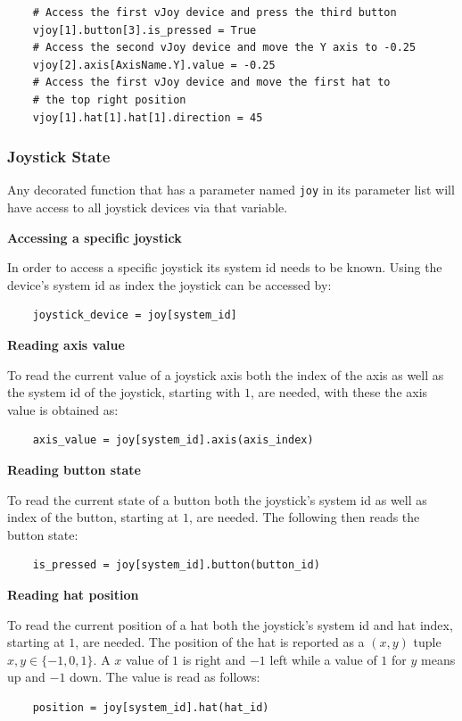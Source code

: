 \documentclass[a4, 10pt]{article}
\begin{document}
\begin{verbatim}
    # Access the first vJoy device and press the third button
    vjoy[1].button[3].is_pressed = True
    # Access the second vJoy device and move the Y axis to -0.25
    vjoy[2].axis[AxisName.Y].value = -0.25
    # Access the first vJoy device and move the first hat to
    # the top right position
    vjoy[1].hat[1].hat[1].direction = 45
\end{verbatim}


\subsubsection{Joystick State}

Any decorated function that has a parameter named \verb+joy+ in its
parameter list will have access to all joystick devices via that
variable.

\vspace{1em}
\noindent\textbf{Accessing a specific joystick}

\noindent In order to access a specific joystick its system id needs to
be known. Using the device's system id as index the joystick can be
accessed by:
\begin{verbatim}
    joystick_device = joy[system_id]
\end{verbatim}


\noindent\textbf{Reading axis value}

\noindent To read the current value of a joystick axis both the index of
the axis as well as the system id of the joystick, starting with $1$,
are needed, with these the axis value is obtained as:
\begin{verbatim}
    axis_value = joy[system_id].axis(axis_index)
\end{verbatim}


\noindent\textbf{Reading button state}

\noindent To read the current state of a button both the joystick's
system id as well as index of the button, starting at $1$, are needed.
The following then reads the button state:
\begin{verbatim}
    is_pressed = joy[system_id].button(button_id)
\end{verbatim}


\noindent\textbf{Reading hat position}

\noindent To read the current position of a hat both the joystick's
system id and hat index, starting at $1$, are needed. The position of
the hat is reported as a $(x, y)$ tuple $x, y \in \{-1, 0, 1\}$. A $x$
value of $1$ is right and $-1$ left while a value of $1$ for $y$ means
up and $-1$ down. The value is read as follows:
\begin{verbatim}
    position = joy[system_id].hat(hat_id)
\end{verbatim}
\end{document}
